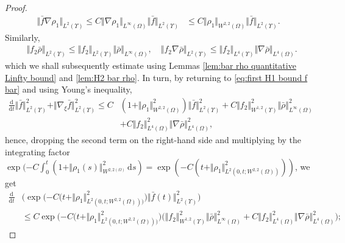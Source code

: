 \documentclass[11pt,a4paper,reqno]{amsart}
\theoremstyle{remark}
\theoremstyle{definition}
\numberwithin{equation}{section}
\newcommand{\bxi}{\xi}
\renewcommand{\d}{\, \mathrm{d} }
\newcommand{\der}{\mathrm{d}}
\begin{document}
\begin{proof}
\begin{equation*}
    \begin{aligned}
        \Vert \bar{f} \nabla \rho_1 \Vert_{L^2(\Upsilon)} \leq C \Vert \nabla \rho_1 \Vert_{L^\infty(\Omega)} \Vert \bar{f} \Vert_{L^2(\Upsilon)} &\leq C \Vert \rho_1 \Vert_{W^{2,2}(\Omega)} \Vert \bar{f} \Vert_{L^2(\Upsilon)}. 
    \end{aligned}
\end{equation*}
Similarly, 
\begin{equation*}
    \begin{aligned}
       &\Vert f_2 \bar{\rho} \Vert_{L^2(\Upsilon)} \leq \Vert f_2 \Vert_{L^2(\Upsilon)} \Vert \bar{\rho} \Vert_{L^\infty(\Omega)}, \quad \Vert f_2 \nabla \bar{\rho} \Vert_{L^2(\Upsilon)} \leq \Vert f_2 \Vert_{L^{4}(\Upsilon)} \Vert \nabla \bar{\rho} \Vert_{L^4(\Omega)}. 
    \end{aligned}
\end{equation*}
which we shall subsequently estimate using Lemmas \ref{lem:bar rho quantitative Linfty bound} and \ref{lem:H2 bar rho}. In turn, by returning to \eqref{eq:first H1 bound f bar} and using Young's inequality, 
\begin{equation}\label{eq:returning to 8.10}
    \begin{aligned}
        \frac{\der}{\der t}\Vert\bar{f}\Vert_{L^2(\Upsilon)}^2 + \Vert \nabla_{\bxi} \bar{f}\Vert_{L^2(\Upsilon)}^2 \leq C &  (1 + \Vert \rho_1 \Vert_{W^{2,2}(\Omega)}^2 ) \Vert \bar{f} \Vert_{L^2(\Upsilon)}^{2} + C \Vert f_2 \Vert_{W^{1,2}(\Upsilon)}^2 \Vert \bar{\rho} \Vert_{L^\infty(\Omega)}^2  \\ 
        & + C\Vert f_2 \Vert_{L^4(\Omega)}^2 \Vert \nabla\bar{\rho} \Vert_{L^4(\Omega)}^2, 
    \end{aligned}
\end{equation}
hence, dropping the second term on the right-hand side and multiplying by the integrating factor $\exp(-C\int_0^t (1+\Vert \rho_1 (s)\Vert^2_{W^{2,2(\Omega)}} \d s ) = \exp(-C(t+\Vert \rho_1 \Vert^2_{L^2(0,t;W^{2,2}(\Omega))}))$, we get 
\begin{equation*}
    \begin{aligned}
        \frac{\der}{\der t}&\Big( \exp\big({-C(t+\Vert \rho_1 \Vert^2_{L^2(0,t;W^{2,2}(\Omega)))}} \big)\Vert\bar{f}(t)\Vert_{L^2(\Upsilon)}^2 \Big) \\ 
        &\leq C \exp\big({-C(t+\Vert \rho_1 \Vert^2_{L^2(0,t;W^{2,2}(\Omega)))}} \big) \Big(  \Vert f_2 \Vert_{W^{1,2}(\Upsilon)}^2 \Vert \bar{\rho} \Vert_{L^\infty(\Omega)}^2  + C\Vert f_2 \Vert_{L^4(\Omega)}^2 \Vert \nabla\bar{\rho} \Vert_{L^4(\Omega)}^2 \Big); 

\end{aligned}
\end{equation*}
\end{proof}
\end{document}
